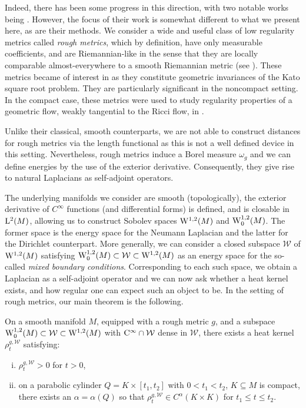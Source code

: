 \documentclass[a4paper, 12pt]{amsart}
\numberwithin{equation}{section}
\renewcommand{\~}{\tilde}
\renewcommand{\-}{\bar}
\newcommand{\8}{\infty}
\newcommand{\cW}{\mathcal{W}}
\newcommand{\intersect}{\cap}
\newcommand{\Lp}[2][{}]{{\rm L}^{#2}_{\rm #1}}		%
\newcommand{\Ck}[2][{}]{{\rm C}^{#2}_{\rm #1}}		%
\newcommand{\Sob}[2][{}]{{\rm W}^{#2}_{\rm #1}}		%
\newcommand{\SobH}[2][{}]{{\Sob[#1]{#2,2}}}	%
\newcommand{\hk}{\rho}
\begin{document}
Indeed, there has been some progress in this direction,
with two notable works being \cite{Norris, ERS}.
However, the focus of their work is somewhat different to 
what we present here, as are their methods.
We consider a wide and useful class of 
low regularity metrics called \emph{rough metrics}, 
which by definition, have only measurable coefficients, and are Riemannian-like in the sense
that they are locally comparable almost-everywhere to a smooth Riemannian metric (see ).
These metrics became of interest in \cite{BMc, BRough} as they constitute geometric invariances of the Kato square
root problem. They are particularly significant in the noncompact setting.  
In the compact case, these metrics were used to study regularity properties
of a geometric flow, weakly tangential to the Ricci flow, 
in \cite{BLM, BCont}.

Unlike their classical, smooth counterparts, we are not able
to construct distances for rough metrics via the length functional as 
this is not a well defined device in this setting.
Nevertheless, rough metrics induce a Borel measure $\omega_g$ and we can define energies by the use 
of the exterior derivative. Consequently,  they give rise to natural Laplacians as self-adjoint operators.

The underlying manifolds we consider are smooth (topologically), 
the exterior derivative of \(C^{\infty}\) functions (and  differential forms)
 is defined, and is closable 
in $\Lp{2}(M)$, allowing us to construct Sobolev spaces $\SobH{1}(M)$
and $\SobH[0]{1}(M)$. The
former space is the energy space for the Neumann Laplacian
and the latter for the Dirichlet counterpart.
More generally, we can consider a closed subspace $\cW$ of $\SobH{1}(M)$
satisfying $\SobH[0]{1}(M) \subset \cW \subset \SobH{1}(M)$
as an energy space for the so-called \emph{mixed boundary conditions}. 
Corresponding to each such space, we obtain a Laplacian
as a self-adjoint operator and we can now ask
whether a heat kernel exists, and how regular one
can expect such an object to be. In the setting of rough metrics, our main theorem
is the following. 

\begin{thm}
\label{Thm:Main}
On a smooth manifold \(M\), equipped with a rough metric \(g\), 
and a subspace $\SobH[0]{1}(M) \subset \cW \subset \SobH{1}(M)$
with $\Ck{\infty} \intersect \cW$ dense in $\cW$, 
there exists a heat kernel \(\hk_t^{g,\cW}\) satisfying:  
\begin{enumerate}[(i)] 
\item \(\hk_t^{g,\cW} > 0\) for \(t > 0\),
\item on a parabolic cylinder \(Q = K \times [t_1, t_2]\) with \(0 < t_1 < t_2\), \(K \subseteq M\) is compact, there exists an \(\alpha = \alpha(Q)\) so that \(\hk_t^{g,\cW} \in C^{\alpha}(K \times K)\) for \(t_1 \leq t \leq t_2\).
\end{enumerate}
\end{thm}
\end{document}
